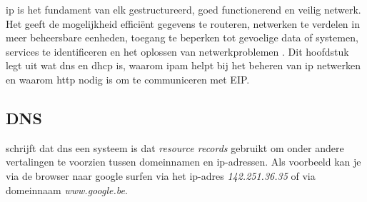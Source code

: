 
\acrfull{ip} is het fundament van elk gestructureerd, goed functionerend en veilig netwerk. Het geeft de mogelijkheid efficiënt gegevens te routeren, netwerken te verdelen in meer beheersbare eenheden, toegang te beperken tot gevoelige data of systemen, services te identificeren en het oplossen van netwerkproblemen \autocite{Postel1981}. Dit hoofdstuk legt uit wat \acrfull{dns} en \acrfull{dhcp} is, waarom \acrshort{ipam} helpt bij het beheren van \acrshort{ip} netwerken en waarom \acrshort{http} nodig is om te communiceren met EIP. 

\subsection{DNS}
\textcite{Mockapetris1987} schrijft dat \acrshort{dns} een systeem is dat \textit{resource records} gebruikt om onder andere vertalingen te voorzien tussen domeinnamen en \acrshort{ip}-adressen. Als voorbeeld kan je via de browser naar google surfen via het \acrshort{ip}-adres \textit{142.251.36.35} of via domeinnaam \textit{www.google.be}.

